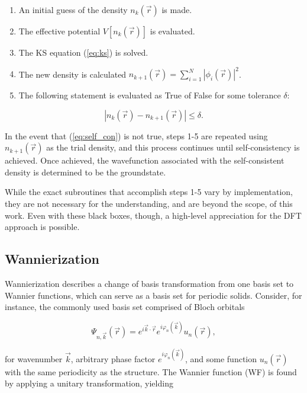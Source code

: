         \begin{enumerate}
            \item An initial guess of the density $n_k(\Vec{r})$ is made.
            \item The effective potential $V[n_k(\vec{r})]$ is evaluated.
            \item The KS equation (\ref{eq:ks}) is solved.
            \item The new density is calculated $n_{k+1}(\Vec{r}) = \sum\limits_{i=1}^N |\phi_i(\vec{r})|^2$.
            \item The following statement is evaluated as True of False for some tolerance $\delta$:
        \end{enumerate}
        
        \begin{equation}
        \label{eq:self_con}
            |n_{k}(\vec{r}) - n_{k+1}(\vec{r})| \le \delta.
        \end{equation}
        
        \noindent In the event that (\ref{eq:self_con}) is not true, steps 1-5 are repeated using $n_{k+1}(\Vec{r})$ as the trial density, and this process continues until self-consistency is achieved. Once achieved, the wavefunction associated with the self-consistent density is determined to be the groundstate.
        
        While the exact subroutines that accomplish steps 1-5 vary by implementation, they are not necessary for the understanding, and are beyond the scope, of this work. Even with these black boxes, though, a high-level appreciation for the DFT approach is possible.
    
    \subsection{Wannierization}
    
    Wannierization describes a change of basis transformation from one basis set to Wannier functions, which can serve as a basis set for periodic solids. Consider, for instance, the commonly used basis set comprised of Bloch orbitals
    
    \begin{equation}
    \label{eq:wan_1}
        \Psi_{n,\vec{k}}(\Vec{r}) = e^{i\Vec{k}\cdot\Vec{r}} e^{i\varphi_n(\vec{k})} u_n(\vec{r}), 
    \end{equation}
    
    \noindent for wavenumber $\vec{k}$, arbitrary phase factor $e^{i\varphi_n(\vec{k})}$, and some function $u_n(\vec{r})$ with the same periodicity as the structure. The Wannier function (WF) is found by applying a unitary transformation, yielding
    
